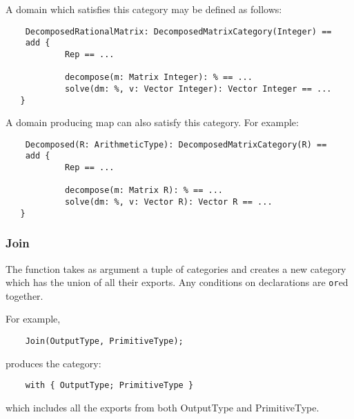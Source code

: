 {A domain which satisfies this category may be defined as follows:

\begin{small}
\begin{verbatim}
    DecomposedRationalMatrix: DecomposedMatrixCategory(Integer) ==
    add {
            Rep == ...

            decompose(m: Matrix Integer): % == ...
            solve(dm: %, v: Vector Integer): Vector Integer == ...
   }
\end{verbatim}
\end{small}%

A domain producing map can also satisfy this category. For example:

\begin{small}
\begin{verbatim}
    Decomposed(R: ArithmeticType): DecomposedMatrixCategory(R) ==
    add {
            Rep == ...

            decompose(m: Matrix R): % == ...
            solve(dm: %, v: Vector R): Vector R == ...
   }
\end{verbatim}
\end{small}%

\subsubsection{Join}

The  function takes as argument a tuple of categories and
creates a new category which has the union of all their exports.
Any conditions on declarations are \verb"or"ed together.

For example, 

\begin{small}
\begin{verbatim}
    Join(OutputType, PrimitiveType);
\end{verbatim}
\end{small}%

produces the category:

\begin{small}
\begin{verbatim}
    with { OutputType; PrimitiveType }
\end{verbatim}
\end{small}%

which includes all the exports from both OutputType and PrimitiveType.

}
